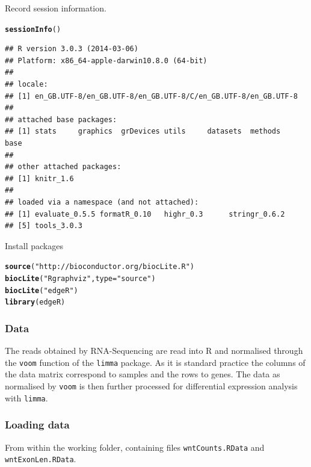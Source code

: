 \documentclass[a4paper]{article}\usepackage[]{graphicx}\usepackage[]{color}
\makeatletter
\newcommand{\hlstr}[1]{\textcolor[rgb]{0.192,0.494,0.8}{#1}}%
\newcommand{\hlstd}[1]{\textcolor[rgb]{0.345,0.345,0.345}{#1}}%
\newcommand{\hlkwc}[1]{\textcolor[rgb]{0.333,0.667,0.333}{#1}}%
\newcommand{\hlkwd}[1]{\textcolor[rgb]{0.737,0.353,0.396}{\textbf{#1}}}%
\newenvironment{kframe}{%
 \def\at@end@of@kframe{}%
 \ifinner\ifhmode%
  \def\at@end@of@kframe{\end{minipage}}%
  \begin{minipage}{\columnwidth}%
 \fi\fi%
 \def\FrameCommand##1{\hskip\@totalleftmargin \hskip-\fboxsep
 \colorbox{shadecolor}{##1}\hskip-\fboxsep
     \hskip-\linewidth \hskip-\@totalleftmargin \hskip\columnwidth}%
 \MakeFramed {\advance\hsize-\width
   \@totalleftmargin\z@ \linewidth\hsize
   \@setminipage}}%
 {\par\unskip\endMakeFramed%
 \at@end@of@kframe}
\newenvironment{knitrout}{}{} %
\makeatother
\begin{document}
Record session information.
\begin{knitrout}
\color{fgcolor}\begin{kframe}
\begin{alltt}
\hlkwd{sessionInfo}\hlstd{()}
\end{alltt}
\begin{verbatim}
## R version 3.0.3 (2014-03-06)
## Platform: x86_64-apple-darwin10.8.0 (64-bit)
## 
## locale:
## [1] en_GB.UTF-8/en_GB.UTF-8/en_GB.UTF-8/C/en_GB.UTF-8/en_GB.UTF-8
## 
## attached base packages:
## [1] stats     graphics  grDevices utils     datasets  methods   base     
## 
## other attached packages:
## [1] knitr_1.6
## 
## loaded via a namespace (and not attached):
## [1] evaluate_0.5.5 formatR_0.10   highr_0.3      stringr_0.6.2 
## [5] tools_3.0.3
\end{verbatim}
\end{kframe}
\end{knitrout}

Install packages
\begin{knitrout}
\color{fgcolor}\begin{kframe}
\begin{alltt}
\hlkwd{source}\hlstd{(}\hlstr{"http://bioconductor.org/biocLite.R"}\hlstd{)}
\hlkwd{biocLite}\hlstd{(}\hlstr{"Rgraphviz"}\hlstd{,} \hlkwc{type} \hlstd{=} \hlstr{"source"}\hlstd{)}
\hlkwd{biocLite}\hlstd{(}\hlstr{"edgeR"}\hlstd{)}
\hlkwd{library}\hlstd{(edgeR)}
\end{alltt}
\end{kframe}
\end{knitrout}

\subsubsection*{Data}
The reads obtained by RNA-Sequencing are read into R and normalised through the \verb'voom' function \cite{art:Smyth2014} of the \verb'limma' package. As it is standard practice the columns of the data matrix correspond to samples and the rows to genes. The data as normalised by \verb'voom' is then further processed for differential expression analysis with \verb'limma'.

\subsubsection*{Loading data}
From within the working folder, containing files \verb'wntCounts.RData' and \verb'wntExonLen.RData'.
\end{document}
